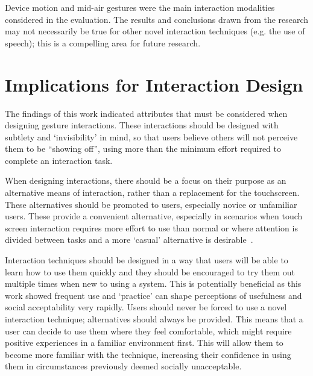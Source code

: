 \documentclass{l4proj}
\begin{document}
Device motion and mid-air gestures were the main interaction modalities considered in the evaluation. The results and conclusions drawn from the research may not necessarily be true for other novel interaction techniques (e.g. the use of speech); this is a compelling area for future research.


\section{Implications for Interaction Design}
The findings of this work indicated attributes that must be considered when designing gesture interactions. These interactions should be designed with subtlety and `invisibility' in mind, so that users believe others will not perceive them to be ``showing off'', using more than the minimum effort required to complete an interaction task. 

When designing interactions, there should be a focus on their purpose as an alternative means of interaction, rather than a replacement for the touchscreen. These alternatives should be promoted to users, especially novice or unfamiliar users. These provide a convenient alternative, especially in scenarios when touch screen interaction requires more effort to use than normal or where attention is divided between tasks and a more `casual' alternative is desirable~\citet{pohl_focused_2013}.

Interaction techniques should be designed in a way that users will be able to learn how to use them quickly and they should be encouraged to try them out multiple times when new to using a system. This is potentially beneficial as this work showed frequent use and `practice' can shape perceptions of usefulness and social acceptability very rapidly. Users should never be forced to use a novel interaction technique; alternatives should always be provided. This means that a user can decide to use them where they feel comfortable, which might require positive experiences in a familiar environment first. This will allow them to become more familiar with the technique, increasing their confidence in using them in circumstances previously deemed socially unacceptable.
\end{document}
